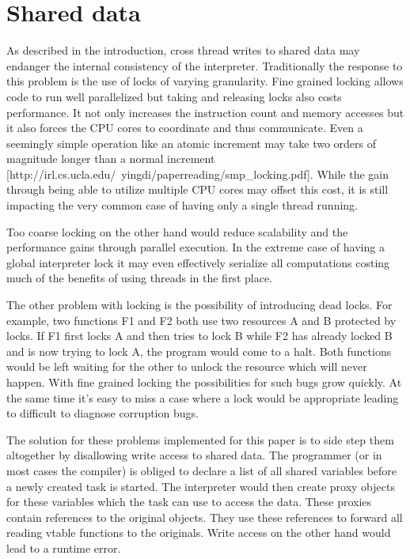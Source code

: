 \documentclass[bachelor,english]{hgbthesis}
\begin{document}
\section{Shared data}

As described in the introduction, cross thread writes to shared data may endanger the internal consistency of the interpreter. Traditionally the response to this problem is the use of locks of varying granularity. Fine grained locking allows code to run well parallelized but taking and releasing locks also costs performance. It not only increases the instruction count and memory accesses but it also forces the CPU cores to coordinate and thus communicate. Even a seemingly simple operation like an atomic increment may take two orders of magnitude longer than a normal increment [http://irl.cs.ucla.edu/~yingdi/paperreading/smp\_locking.pdf]. While the gain through being able to utilize multiple CPU cores may offset this cost, it is still impacting the very common case of having only a single thread running.

Too coarse locking on the other hand would reduce scalability and the performance gains through parallel execution. In the extreme case of having a global interpreter lock it may even effectively serialize all computations costing much of the benefits of using threads in the first place.

The other problem with locking is the possibility of introducing dead locks. For example, two functions F1 and F2 both use two resources A and B protected by locks. If F1 first locks A and then tries to lock B while F2 has already locked B and is now trying to lock A, the program would come to a halt. Both functions would be left waiting for the other to unlock the resource which will never happen. With fine grained locking the possibilities for such bugs grow quickly. At the same time it's easy to miss a case where a lock would be appropriate leading to difficult to diagnose corruption bugs.

The solution for these problems implemented for this paper is to side step them altogether by disallowing write access to shared data. The programmer (or in most cases the compiler) is obliged to declare a list of all shared variables before a newly created task is started. The interpreter would then create proxy objects for these variables which the task can use to access the data. These proxies contain references to the original objects. They use these references to forward all reading vtable functions to the originals. Write access on the other hand would lead to a runtime error.
\end{document}
